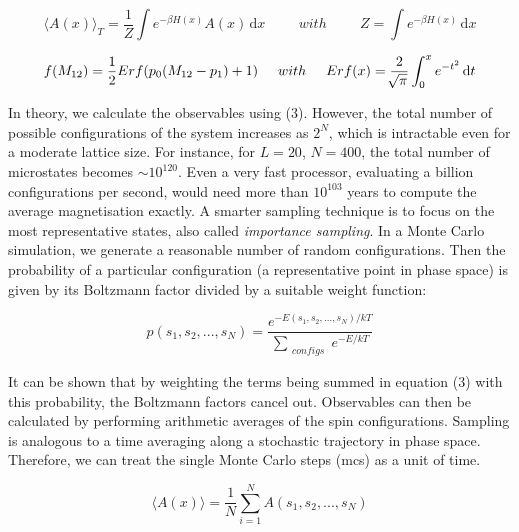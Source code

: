 \documentclass[a4paper]{article}
\begin{document}
\begin{equation}
\langle A(x) \rangle_T = \frac{1}{Z} \int e^{-\beta H(x)}A(x)\, \mathrm{d}x \hspace{1cm}  with \hspace{1cm} Z = \int e^{-\beta H(x)}\, \mathrm{d}x
\end{equation}

\vspace{2cm}


\begin{equation}
f(M_{12})  = \frac{1}{2} Erf(p_0(M_{12} -p_{1}) + 1 ) \hspace{0.5cm} with \hspace{0.5cm} Erf(x) = \frac{2}{\sqrt[]{\pi}} \int_{0}^{x}  e^{-t^2}\, \mathrm{d}t
\end{equation}

In theory, we calculate the observables using (3). However, the total number of possible configurations of the system increases as $2^N$, which is intractable even for a moderate lattice size. For instance, for $L = 20 $, $N = 400$, the total number of microstates becomes $\sim 10^{120}$. Even a very fast processor, evaluating a billion configurations per second, would need more than $10^{103}$ years to compute the average magnetisation exactly. A smarter sampling technique is to focus on the most representative states, also called \textit{importance sampling}. In a Monte Carlo simulation, we generate a reasonable number of random configurations. Then the probability of a particular configuration (a representative point in phase space) is given by its Boltzmann factor divided by a suitable weight function:

\begin{equation}
 p(s_1, s_2, ..., s_N) = \frac{e^{-E(s_1, s_2, ..., s_N)/kT}}{\sum_{\substack{ configs}} e^{-E/kT}}
\end{equation}

It can be shown that by weighting the terms being summed in equation (3) with this probability, the Boltzmann factors cancel out. Observables can then be calculated by performing arithmetic averages of the spin configurations. Sampling is analogous to a time averaging along a stochastic trajectory in phase space. Therefore, we can treat the single Monte Carlo steps (mcs) as a unit of time. 

\begin{equation}
\langle A(x) \rangle = \frac{1}{N} \sum_{i=1}^{N} A(s_1, s_2, ..., s_N)
\end{equation}
\end{document}
